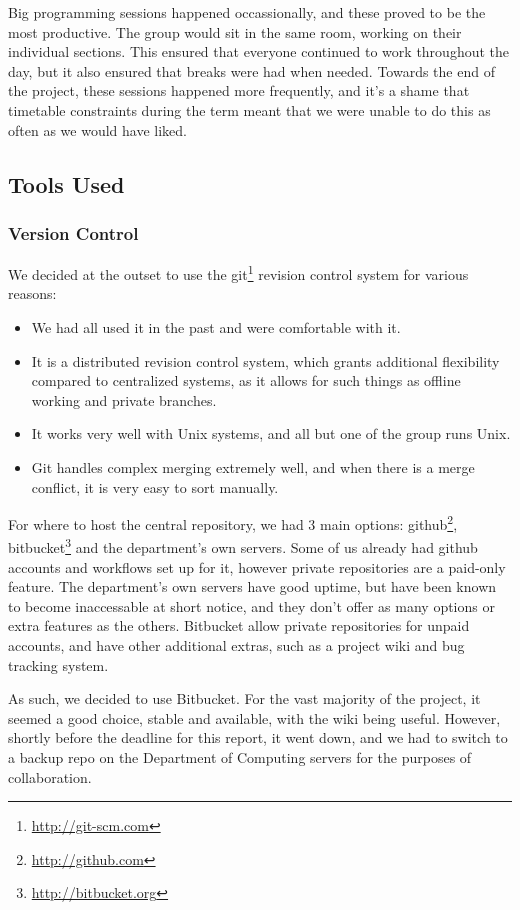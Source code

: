   Big programming sessions happened occassionally, and these proved to be the most productive. The group would sit in the same room, working on their individual sections. This ensured that everyone continued to work throughout the day, but it also ensured that breaks were had when needed. Towards the end of the project, these sessions happened more frequently, and it's a shame that timetable constraints during the term meant that we were unable to do this as often as we would have liked.

  \subsection{Tools Used}
    \subsubsection{Version Control}
      We decided at the outset to use the git\footnote{\url{http://git-scm.com}} revision control system for various reasons:
      \begin{itemize}
      \item We had all used it in the past and were comfortable with it.
      \item It is a distributed revision control system, which grants additional flexibility compared to centralized systems, as it allows for such things as offline working and private branches.
      \item It works very well with Unix systems, and all but one of the group runs Unix.
      \item Git handles complex merging extremely well, and when there is a merge conflict, it is very easy to sort manually.
      \end{itemize}

      For where to host the central repository, we had 3 main options: github\footnote{\url{http://github.com}}, bitbucket\footnote{\url{http://bitbucket.org}} and the department's own servers.
      Some of us already had github accounts and workflows set up for it, however private repositories are a paid-only feature.
      The department's own servers have good uptime, but have been known to become inaccessable at short notice, and they don't offer as many options or extra features as the others.
      Bitbucket allow private repositories for unpaid accounts, and have other additional extras, such as a project wiki and bug tracking system.

      As such, we decided to use Bitbucket.
      For the vast majority of the project, it seemed a good choice, stable and available, with the wiki being useful.
      However, shortly before the deadline for this report, it went down, and we had to switch to a backup repo on the Department of Computing servers for the purposes of collaboration.  
